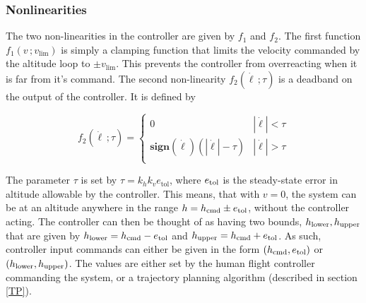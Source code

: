 \documentclass[11pt]{scrartcl} %
\begin{document}
\subsubsection{Nonlinearities}

The two non-linearities in the controller are given by $f_1$ and $f_2$. The first function $f_1(v\,;v_{\mathrm{lim}})$ is simply a clamping function that limits the velocity commanded by the altitude loop to $\pm v_{\mathrm{lim}}$. This prevents the controller from overreacting when it is far from it's command. The second non-linearity $f_2(\dot \ell \, ; \tau)$ is a deadband on the output of the controller. It is defined by 

\begin{figure}[h!]
\begin{center}
\begin{multicols}{2}
\null \vfill
\[
f_2(\dot \ell \, ; \tau) = \left\{\begin{array}{cc}
0 & |\dot \ell| < \tau \\ 
\mathrm{\textbf{sign}}(\dot \ell)(|\dot \ell| - \tau) & |\dot \ell| > \tau \\ 
\end{array}
\right.\] 
\vfill \null
{}
\end{multicols}
\end{center}
\vspace*{-1em}
\end{figure}
The parameter $\tau$ is set by $\tau = k_hk_ve_{\mathrm{tol}}$, where $e_{\mathrm{tol}}$ is the steady-state error in altitude allowable by the controller. This means, that with $v=0$, the system can be at an altitude anywhere in the range $h = h_{\mathrm{cmd}} \pm e_{\mathrm{tol}}$, without the controller acting. The controller can then be thought of as having two bounds, $h_{\mathrm{lower}},h_{\mathrm{upper}}$ that are given by $h_{\mathrm{lower}} = h_{\mathrm{cmd}} - e_{\mathrm{tol}}$ and $h_{\mathrm{upper}} = h_{\mathrm{cmd}} + e_{\mathrm{tol}}$. As such, controller input commands can either be given in the form $(h_{\mathrm{cmd}}, e_{\mathrm{tol}})$ or $(h_{\mathrm{lower}},h_{\mathrm{upper}})$. The values are either set by the human flight controller commanding the system, or a trajectory planning algorithm (described in section \ref{TP}).
\end{document}

